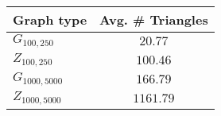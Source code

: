 \documentclass[11pt,letterpaper]{article}
\begin{document}
\begin{table}[h!]
\begin{center}
\begin{tabular}{l|c}
Graph type & Avg. \# Triangles \\ \hline
$G_{100,250}$   & $20.77$ \\
$Z_{100,250}$   & $100.46$ \\
$G_{1000,5000}$ & $166.79$ \\
$Z_{1000,5000}$ & $1161.79$ \\
\end{tabular}
\end{center}
\end{table}

% 
% 
\end{document}

